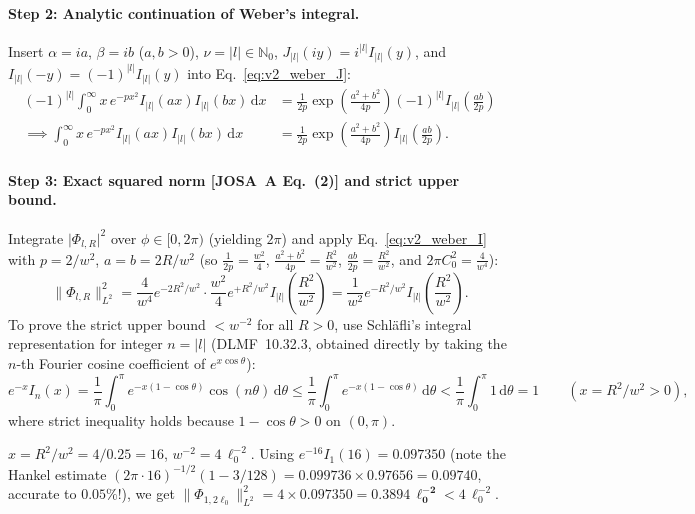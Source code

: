 \documentclass[10pt,letterpaper]{article}
\newcommand{\norm}[1]{\lVert #1 \rVert}
\newcommand{\abs}[1]{\lvert #1 \rvert}
\newcommand{\dd}{\mathrm{d}}
\newcommand{\josa}[1]{\textbf{[JOSA~A Eq.~(#1)]}}
\numberwithin{equation}{section}
\begin{document}
\paragraph*{Step 2: Analytic continuation of Weber's integral.}
Insert $\alpha = ia$, $\beta = ib$ ($a,b>0$), $\nu = \abs{l} \in \mathbb{N}_0$, $J_{\abs{l}}(iy) = i^{\abs{l}} I_{\abs{l}}(y)$, and $I_{\abs{l}}(-y) = (-1)^{\abs{l}} I_{\abs{l}}(y)$ into Eq.~\eqref{eq:v2_weber_J}:
\begin{align}
  (-1)^{\abs{l}}\int_0^\infty x\,e^{-px^2} I_{\abs{l}}(ax) I_{\abs{l}}(bx)\,\dd x
  &= \frac{1}{2p}\exp\!\left(\frac{a^2+b^2}{4p}\right)(-1)^{\abs{l}} I_{\abs{l}}\!\left(\frac{ab}{2p}\right) \nonumber \\
  \implies \int_0^\infty x\,e^{-px^2} I_{\abs{l}}(ax) I_{\abs{l}}(bx)\,\dd x
  &= \frac{1}{2p}\exp\!\left(\frac{a^2+b^2}{4p}\right) I_{\abs{l}}\!\left(\frac{ab}{2p}\right).
  \label{eq:v2_weber_I}
\end{align}

\paragraph*{Step 3: Exact squared norm \josa{2} and strict upper bound.}
Integrate $\abs{\Phi_{l,R}}^2$ over $\phi \in [0,2\pi)$ (yielding $2\pi$) and apply Eq.~\eqref{eq:v2_weber_I} with $p = 2/w^2$, $a = b = 2R/w^2$ (so $\frac{1}{2p} = \frac{w^2}{4}$, $\frac{a^2+b^2}{4p} = \frac{R^2}{w^2}$, $\frac{ab}{2p} = \frac{R^2}{w^2}$, and $2\pi C_0^2 = \frac{4}{w^4}$):
\begin{equation}
  \norm{\Phi_{l,R}}_{L^2}^2 = \frac{4}{w^4} e^{-2R^2/w^2}\cdot\frac{w^2}{4} e^{+R^2/w^2} I_{\abs{l}}\!\left(\frac{R^2}{w^2}\right) = \frac{1}{w^2} e^{-R^2/w^2} I_{\abs{l}}\!\left(\frac{R^2}{w^2}\right).
\end{equation}
To prove the strict upper bound $< w^{-2}$ for all $R > 0$, use Schl\"afli's integral representation for integer $n = \abs{l}$ (DLMF~10.32.3, obtained directly by taking the $n$-th Fourier cosine coefficient of $e^{x\cos\theta}$):
\begin{equation}
  e^{-x} I_n(x) = \frac{1}{\pi}\int_0^\pi e^{-x(1-\cos\theta)}\cos(n\theta)\,\dd\theta \le \frac{1}{\pi}\int_0^\pi e^{-x(1-\cos\theta)}\,\dd\theta < \frac{1}{\pi}\int_0^\pi 1\,\dd\theta = 1\qquad (x = R^2/w^2 > 0),
\end{equation}
where strict inequality holds because $1 - \cos\theta > 0$ on $(0,\pi)$.

\begin{pencheck}[Calculator Check of Eq.~(2) at $R = 2\ell_0$, $w = 0.5\ell_0$, $l = 1$]
$x = R^2/w^2 = 4/0.25 = 16$, $w^{-2} = 4\,\ell_0^{-2}$. Using $e^{-16} I_1(16) = 0.097350$ (note the Hankel estimate $(2\pi\cdot 16)^{-1/2}(1 - 3/128) = 0.099736\times 0.97656 = 0.09740$, accurate to $0.05\%$!), we get $\norm{\Phi_{1,2\ell_0}}_{L^2}^2 = 4 \times 0.097350 = \mathbf{0.3894\,\ell_0^{-2}} < 4\,\ell_0^{-2}$.
\end{pencheck}
\end{document}
